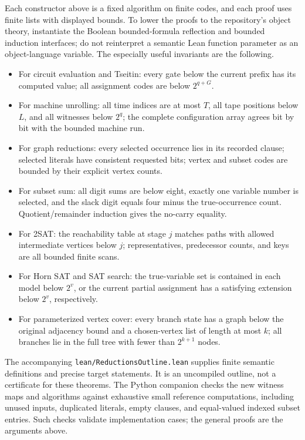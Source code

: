Each constructor above is a fixed algorithm on finite codes, and each proof
uses finite lists with displayed bounds. To lower the proofs to the repository's
object theory, instantiate the Boolean bounded-formula reflection and bounded
induction interfaces; do not reinterpret a semantic Lean function parameter as
an object-language variable. The especially useful invariants are the
following.

\begin{itemize}
\item For circuit evaluation and Tseitin: every gate below the current prefix
has its computed value; all assignment codes are below $2^{q+G}$.
\item For machine unrolling: all time indices are at most $T$, all tape
positions below $L$, and all witnesses below $2^q$; the complete configuration
array agrees bit by bit with the bounded machine run.
\item For graph reductions: every selected occurrence lies in its recorded
clause; selected literals have consistent requested bits; vertex and subset
codes are bounded by their explicit vertex counts.
\item For subset sum: all digit sums are below eight, exactly one variable
number is selected, and the slack digit equals four minus the true-occurrence
count. Quotient/remainder induction gives the no-carry equality.
\item For 2SAT: the reachability table at stage $j$ matches paths with allowed
intermediate vertices below $j$; representatives, predecessor counts, and keys
are all bounded finite scans.
\item For Horn SAT and SAT search: the true-variable set is contained in each
model below $2^v$, or the current partial assignment has a satisfying extension
below $2^v$, respectively.
\item For parameterized vertex cover: every branch state has a graph below the
original adjacency bound and a chosen-vertex list of length at most $k$; all
branches lie in the full tree with fewer than $2^{k+1}$ nodes.
\end{itemize}

The accompanying \texttt{lean/ReductionsOutline.lean} supplies finite semantic
definitions and precise target statements. It is an uncompiled outline, not a
certificate for these theorems. The Python companion checks the new witness
maps and algorithms against exhaustive small reference computations, including
unused inputs, duplicated literals, empty clauses, and equal-valued indexed
subset entries. Such checks validate implementation cases; the general proofs
are the arguments above.
